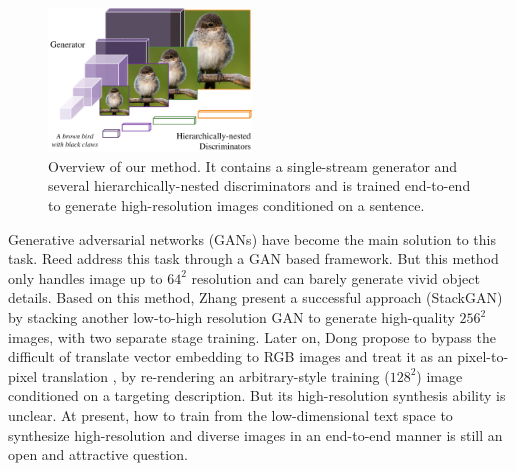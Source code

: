 \documentclass[10pt,twocolumn,letterpaper]{article}
\begin{document}
\begin{figure}[t]
	\centering
	\includegraphics[width=0.48\textwidth]{figure/intro.pdf}
	\caption{Overview of our method. It contains a single-stream generator and several hierarchically-nested discriminators and is trained end-to-end to generate high-resolution images conditioned on a sentence.} \label{fig:archs-review} %
\end{figure}

Generative adversarial networks (GANs) have become the main solution to this task. 
Reed \etal \cite{reed2016generative} address this task through a GAN based framework. But this method only handles image up to $64^2$ resolution and can barely generate vivid object details.
Based on this method, Zhang \etal \cite{han2017stackgan} present a successful approach (StackGAN) by stacking another low-to-high resolution GAN to generate high-quality $256^2$ images, with two separate stage training. Later on, Dong \etal \cite{dong2017semantic} propose to bypass the difficult of translate vector embedding to RGB images and treat it as an pixel-to-pixel translation \cite{isola2016image}, by re-rendering an arbitrary-style training ($128^2$) image conditioned on a targeting description. But its high-resolution synthesis ability is unclear. 
At present, how to train from the low-dimensional text space to synthesize high-resolution and diverse images in an end-to-end manner is still an open and attractive question. 
\end{document}
